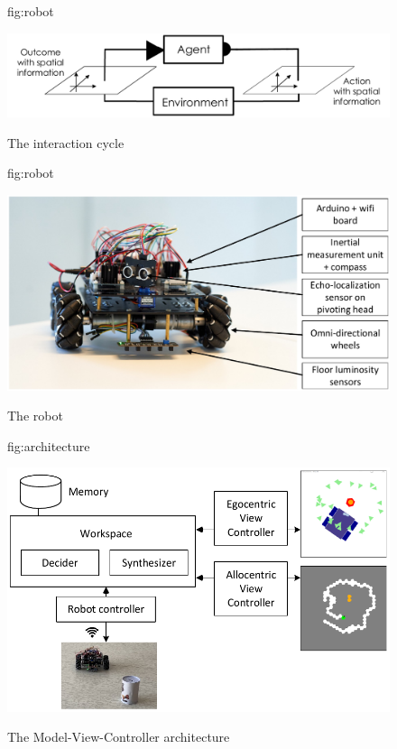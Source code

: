 \documentclass[pmlr]{jmlr}%
\begin{document}
\begin{figure}[htbp]
  \floatconts
  {fig:robot}
  {\caption{The interaction cycle}}
  {\includegraphics[width=0.8\linewidth]{images/Figure_0_Cycle}}
\end{figure}

\begin{figure}[htbp]
	\floatconts
	{fig:robot}
	{\caption{The robot}}
	{\includegraphics[width=0.8\linewidth]{images/Figure_1_Robot}}
\end{figure}


\begin{figure}[htbp]
	\floatconts
	{fig:architecture}
	{\caption{The Model-View-Controller architecture}}
	{\includegraphics[width=0.8\linewidth]{images/Figure_2_Architecture}}
\end{figure}
\end{document}
